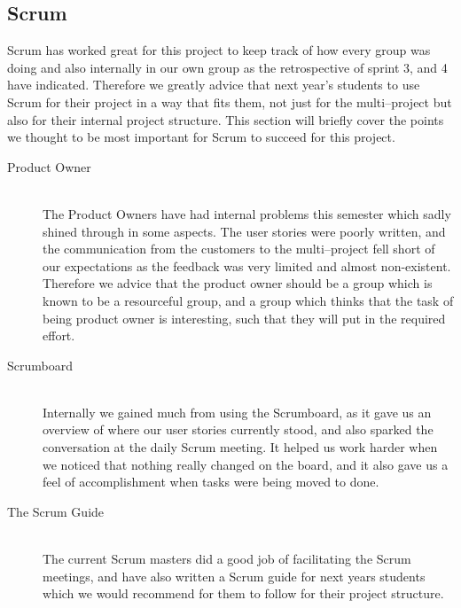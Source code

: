 \subsection{Scrum}
Scrum has worked great for this project to keep track of how every group was doing and also internally in our own group as the retrospective of sprint 3, and 4 have indicated.
Therefore we greatly advice that next year's students to use Scrum for their project in a way that fits them, not just for the multi--project but also for their internal project structure.
This section will briefly cover the points we thought to be most important for Scrum to succeed for this project.

\begin{description}
	\item[Product Owner] \hfill \\
	The Product Owners have had internal problems this semester which sadly shined through in some aspects.
	The user stories were poorly written, and the communication from the customers to the multi--project fell short of our expectations as the feedback was very limited and almost non-existent.
	Therefore we advice that the product owner should be a group which is known to be a resourceful group, and a group which thinks that the task of being product owner is interesting, such that they will put in the required effort.

	\item[Scrumboard] \hfill \\
	Internally we gained much from using the Scrumboard, as it gave us an overview of where our user stories currently stood, and also sparked the conversation at the daily Scrum meeting.
	It helped us work harder when we noticed that nothing really changed on the board, and it also gave us a feel of accomplishment when tasks were being moved to done.

	\item[The Scrum Guide] \hfill \\
	The current Scrum masters did a good job of facilitating the Scrum meetings, and have also written a Scrum guide for next years students which we would recommend for them to follow for their project structure.
\end{description}
